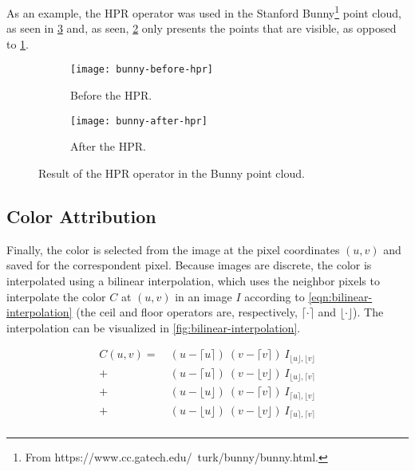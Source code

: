 As an example, the HPR operator was used in the Stanford Bunny\footnote{From https://www.cc.gatech.edu/~turk/bunny/bunny.html.} point cloud, as seen in \cref{fig:hpr-operator-bunny} and, as seen, \cref{fig:after-hpr} only presents the points that are visible, as opposed to \cref{fig:before-hpr}.

\begin{figure}[h]
    
    \centering
    \begin{subfigure}{0.5\textwidth}
        \centering
        \texttt{[image: bunny-before-hpr]}
        \caption{Before the HPR.}
        \label{fig:before-hpr}
    \end{subfigure}%
    \begin{subfigure}{0.5\textwidth}
        \centering
        \texttt{[image: bunny-after-hpr]}
        \caption{After the HPR.}
        \label{fig:after-hpr}
    \end{subfigure}

    \caption{Result of the HPR operator in the Bunny point cloud.}
    \label{fig:hpr-operator-bunny}

\end{figure}

\subsection{Color Attribution}

\newcommand\ceil[1]{\lceil #1 \rceil}
\newcommand\floor[1]{\lfloor #1 \rfloor}

Finally, the color is selected from the image at the pixel coordinates $(u, v)$ and saved for the correspondent pixel. Because images are discrete, the color is interpolated using a bilinear interpolation, which uses the neighbor pixels to interpolate the color $C$ at $(u, v)$ in an image $I$ according to \cref{eqn:bilinear-interpolation} (the ceil and floor operators are, respectively, $\ceil{\cdot}$ and $\floor{\cdot}$). The interpolation can be visualized in \cref{fig:bilinear-interpolation}.

\begin{equation}
    \label{eqn:bilinear-interpolation}
    \begin{aligned}
        C(u, v) = \ & (u - \ceil{u}) \ (v - \ceil{v}) \ I_{\floor{u}, \floor{v}} \\
                + \ &  (u - \ceil{u}) \ (v - \floor{v}) \ I_{\floor{u}, \ceil{v}} \\
                + \ &  (u - \floor{u}) \ (v - \ceil{v}) \ I_{\ceil{u}, \floor{v}} \\
                + \ &  (u - \floor{u}) \ (v - \floor{v}) \ I_{\ceil{u}, \ceil{v}} \\
    \end{aligned}
\end{equation}

